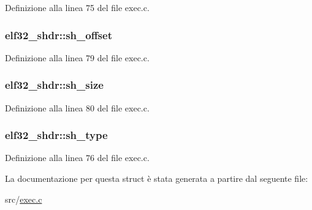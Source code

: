 Definizione alla linea 75 del file exec.\+c.

\hypertarget{structelf32__shdr_a4dea3a6fbd3a62a649d327b515c70cd6}{
\subsubsection[{sh\+\_\+offset}]{ elf32\+\_\+shdr\+::sh\+\_\+offset}}\label{structelf32__shdr_a4dea3a6fbd3a62a649d327b515c70cd6}


Definizione alla linea 79 del file exec.\+c.

\hypertarget{structelf32__shdr_a4addb97e16e7303912fc84daa6f3ac77}{
\subsubsection[{sh\+\_\+size}]{ elf32\+\_\+shdr\+::sh\+\_\+size}}\label{structelf32__shdr_a4addb97e16e7303912fc84daa6f3ac77}


Definizione alla linea 80 del file exec.\+c.

\hypertarget{structelf32__shdr_ab82e07582eb07fc53eec4dca36dddc83}{
\subsubsection[{sh\+\_\+type}]{ elf32\+\_\+shdr\+::sh\+\_\+type}}\label{structelf32__shdr_ab82e07582eb07fc53eec4dca36dddc83}


Definizione alla linea 76 del file exec.\+c.



La documentazione per questa struct è stata generata a partire dal seguente file\+:\begin{DoxyCompactItemize}
\item 
src/\hyperlink{exec_8c}{exec.\+c}\end{DoxyCompactItemize}
